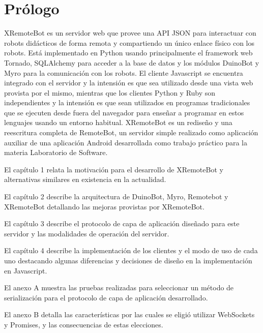 \chapter*{Prólogo}\label{prologo}

XRemoteBot es un servidor web que provee una API JSON para interactuar
con robots didácticos de forma remota y compartiendo un único enlace
físico con los robots. Está implementado en Python usando principalmente el
framework web Tornado, SQLAlchemy para acceder a la base de datos
y los módulos DuinoBot y Myro para
la comunicación con los robots. El cliente Javascript se encuentra
integrado con el servidor y la intensión es que sea utilizado desde una
vista web provista por el mismo, mientras que los clientes Python y Ruby
son independientes y la intensión es que sean utilizados en programas
tradicionales que se ejecuten desde fuera del navegador para enseñar
a programar en estos lenguajes usando un entorno habitual. XRemoteBot
es un rediseño y una reescritura completa de RemoteBot, un servidor
simple realizado como aplicación auxiliar de una aplicación Android
desarrollada
como trabajo práctico para la materia Laboratorio de Software.

El capítulo 1 relata la motivación para el desarrollo de XRemoteBot
y alternativas similares en existencia en la actualidad.

El capítulo 2 describe la arquitectura de DuinoBot, Myro, Remotebot y
XRemoteBot detallando las mejoras provistas por XRemoteBot.

El capítulo 3 describe el protocolo de capa de aplicación diseñado para
este servidor y las modalidades de operación del servidor.

El capítulo 4 describe la implementación de los clientes y el modo de uso
de cada uno destacando algunas diferencias y decisiones de diseño en la
implementación en Javascript.

El anexo A muestra las pruebas realizadas para seleccionar un método
de serialización para el protocolo de capa de aplicación desarrollado.

El anexo B detalla las características por las cuales se eligió utilizar
WebSockets y Promises, y las consecuencias de estas elecciones.

